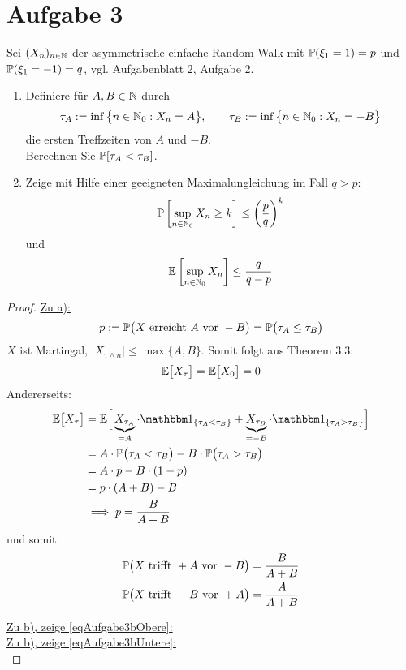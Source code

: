 \documentclass[12pt,a4paper]{article}
\begin{document}
\section*{Aufgabe 3}
Sei $(X_n)_{n\in\N}$ der asymmetrische einfache Random Walk mit $\P(\xi_1=1)=p$ und $\P(\xi_1=-1)=q$, vgl. Aufgabenblatt 2, Aufgabe 2.
\begin{enumerate}[label=\alph*)]
\item Definiere für $A,B\in\N$ durch
\begin{align*}
\tau_A:=\inf\big\lbrace n\in\N_0:X_n=A\big\rbrace,\qquad \tau_B:=\inf\limits\big\lbrace n\in\N_0:X_n=-B\big\rbrace
\end{align*}
die ersten Treffzeiten von $A$ und $-B$.\\
Berechnen Sie $\P[\tau_A<\tau_B]$.
\item Zeige mit Hilfe einer geeigneten Maximalungleichung im Fall $q>p$:
\begin{align}\label{eqAufgabe3bObere}
\P\left[\sup\limits_{n\in\N_0} X_n\geq k\right]\leq\left(\frac{p}{q}\right)^k
\end{align}
und 
\begin{align}\label{eqAufgabe3bUntere}
\E\left[\sup\limits_{n\in\N_0} X_n\right]\leq\frac{q}{q-p}
\end{align}
\end{enumerate}
\begin{proof}
\underline{Zu a):}\\
\begin{align*}
p:=\P\big( X\text{ erreicht }A\text{ vor }-B\big)=\P\big(\tau_A\leq\tau_B\big)
\end{align*}
$X$ ist Martingal, $\big|X_{\tau\wedge n}\big|\leq\max\lbrace A,B\rbrace$. Somit folgt aus Theorem 3.3:
\begin{align*}
\E\big[X_\tau\big]=\E\big[X_0\big]=0
\end{align*}
Andererseits: 
\begin{align*}
\E\big[X_\tau\big]&=\E\Big[\underbrace{X_{\tau_A}}_{=A}\cdot\indi_{\lbrace\tau_A<\tau_B\rbrace}+\underbrace{X_{\tau_B}}_{=-B}\cdot\indi_{\lbrace\tau_A>\tau_B\rbrace}\Big]\\
&=A\cdot\P\big(\tau_A<\tau_B\big)-B\cdot\P\big(\tau_A>\tau_B\big)\\
&=A\cdot p-B\cdot(1-p)\\
&=p\cdot(A+B)-B\\
&\implies
p=\frac{B}{A+B}
\end{align*}
und somit:
\begin{align*}
\P\big(X\text{ trifft }+A\text{ vor }-B\big)&=\frac{B}{A+B}\\
\P\big(X\text{ trifft }-B\text{ vor }+A\big)&=\frac{A}{A+B}\\
\end{align*}

\underline{Zu b), zeige \eqref{eqAufgabe3bObere}:}\\

\underline{Zu b), zeige \eqref{eqAufgabe3bUntere}:}\\

\end{proof}
\end{document}
